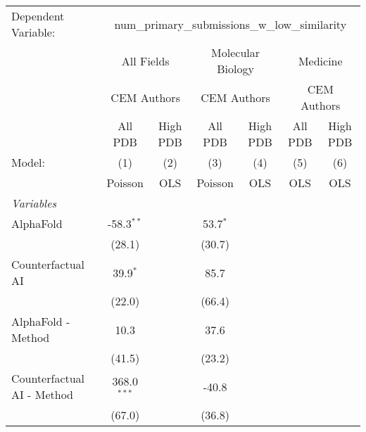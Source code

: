 \begingroup
\centering
\begin{tabular}{lcccccc}
   \tabularnewline \midrule \midrule
   Dependent Variable: & \multicolumn{6}{c}{num\_primary\_submissions\_w\_low\_similarity}\\
 & \multicolumn{2}{c}{All Fields} & \multicolumn{2}{c}{Molecular Biology} & \multicolumn{2}{c}{Medicine} \\
\cmidrule(lr){2-3} \cmidrule(lr){4-5} \cmidrule(lr){6-7}
 & \multicolumn{2}{c}{CEM Authors} & \multicolumn{2}{c}{CEM Authors} & \multicolumn{2}{c}{CEM Authors} \\
\cmidrule(lr){2-3} \cmidrule(lr){4-5} \cmidrule(lr){6-7}
 & \multicolumn{1}{c}{All PDB} & \multicolumn{1}{c}{High PDB} & \multicolumn{1}{c}{All PDB} & \multicolumn{1}{c}{High PDB} & \multicolumn{1}{c}{All PDB} & \multicolumn{1}{c}{High PDB} \\
\cmidrule(lr){2-2} \cmidrule(lr){3-3} \cmidrule(lr){4-4} \cmidrule(lr){5-5} \cmidrule(lr){6-6} \cmidrule(lr){7-7}
   Model:                                                  & (1)           & (2)  & (3)        & (4)  & (5)  & (6)\\  
                                                           &  Poisson      & OLS  & Poisson    & OLS  & OLS  & OLS\\  
   \midrule
   \emph{Variables}\\
   AlphaFold                                               & -58.3$^{**}$  &      & 53.7$^{*}$ &      &      &   \\   
                                                           & (28.1)        &      & (30.7)     &      &      &   \\   
   Counterfactual AI                                       & 39.9$^{*}$    &      & 85.7       &      &      &   \\   
                                                           & (22.0)        &      & (66.4)     &      &      &   \\   
   AlphaFold - Method                                      & 10.3          &      & 37.6       &      &      &   \\   
                                                           & (41.5)        &      & (23.2)     &      &      &   \\   
   Counterfactual AI - Method                              & 368.0$^{***}$ &      & -40.8      &      &      &   \\   
                                                           & (67.0)        &      & (36.8)     &      &      &   \\   

\end{tabular}
